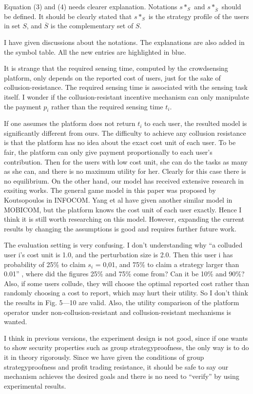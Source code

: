 \documentclass[a4paper,11pt]{exam}
\begin{document}
\begin{questions}
\question Equation (3) and (4) needs clearer explanation. Notations $s*_S$ and $s*_{\overline{S}}$ should be defined. It should be clearly stated that $s*_S$ is the strategy profile of the users in set $S$, and $\overline{S}$ is the complementary set of $S$. 
\begin{solution}
I have given discussions about the notations. The explanations are also added in the symbol table. All the new entries are highlighted in blue.
\end{solution}

\question It is strange that the required sensing time, computed by the crowdsensing platform, only depends on the reported cost of users, just for the sake of collusion-resistance. The required sensing time is associated with the sensing task itself. I wonder if the collusion-resistant incentive mechanism can only manipulate the payment $p_i$ rather than the required sensing time $t_i$. 
\begin{solution}
If one assumes the platform does not return $t_i$ to each user, the resulted model is significantly different from ours. The difficulty to achieve any collusion resistance is that the platform has no idea about the exact cost unit of each user. To be fair, the platform can only give payment proportionally to each user's contribution. Then for the users with low cost unit, she can do the tasks as many as she can, and there is no maximum utility for her. Clearly for this case there is no equilibrium. On the other hand, our model has received extensive research in exsiting works. 
The general game model in this paper was proposed by Koutsopoulos in INFOCOM. Yang et al have given another similar model in MOBICOM, but the platform knows the cost unit of each user exactly. Hence I think it is still worth researching on this model. However, expanding the current results by changing the assumptions is good and requires further future work.
\end{solution}

\question The evaluation setting is very confusing. I don’t understanding why “a colluded user i’s cost unit is 1.0, and the perturbation size is 2.0. Then this user i has probability of 25\% to claim $s_i$ = 0,01, and 75\% to claim a strategy larger than 0.01” , where did the figures 25\% and 75\% come from? Can it be 10\% and 90\%? Also, if some users collude, they will choose the optimal reported cost rather than randomly choosing a cost to report, which may hurt their utility.  So I don’t think the results in Fig. 5---10 are valid. Also, the utility comparison of the platform operator under non-collusion-resistant and collusion-resistant mechanisms is wanted. 
\begin{solution}
I think in previous versions, the experiment design is not good, since if one wants to show security properties such as group strategyproofness, the only way is to do it in theory rigorously. Since we have given the conditions of group strategyproofness and profit trading resistance, it should be safe to say our mechanism achieves the desired goals and there is no need to ``verify'' by using experimental results. 


\end{solution}
\end{questions}
\end{document}
